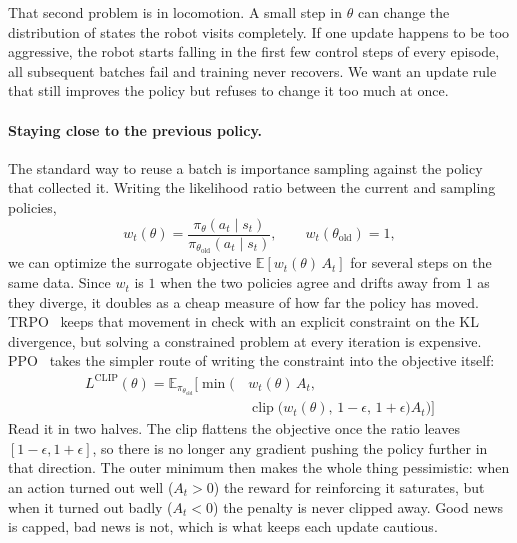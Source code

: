 \documentclass{article}
\theoremstyle{plain}
\theoremstyle{definition}
\theoremstyle{remark}
\begin{document}
That second problem is in locomotion. A small step in $\theta$ can change the 
distribution of states the robot visits completely. If one update happens to be 
too aggressive, the robot starts falling in the first few control steps of every 
episode, all subsequent batches fail and training never recovers. We want an update 
rule that still improves the policy but refuses to change it too much at once.

\paragraph{Staying close to the previous policy.}
The standard way to reuse a batch is importance sampling against the policy that
collected it. Writing the likelihood ratio between the current and sampling
policies,
\begin{equation}
    w_t(\theta) = \frac{\pi_\theta(a_t \mid s_t)}{\pi_{\theta_{\text{old}}}(a_t \mid s_t)},
    \qquad w_t(\theta_{\text{old}}) = 1,
\end{equation}
we can optimize the surrogate objective $\mathbb{E}[w_t(\theta)\,A_t]$ for
several steps on the same data. Since $w_t$ is $1$ when the two policies agree
and drifts away from $1$ as they diverge, it doubles as a cheap measure of how
far the policy has moved. TRPO~\cite{schulman2015trpo} keeps that movement in
check with an explicit constraint on the KL divergence, but solving a constrained
problem at every iteration is expensive.
PPO~\cite{schulman2017ppo} takes the simpler route of writing the constraint
into the objective itself:
\begin{equation}
\begin{split}
    L^{\text{CLIP}}(\theta)
        = \mathbb{E}_{\pi_{\theta_{\text{old}}}} \Big[
          \min\!\big( &\, w_t(\theta)\, A_t, \\
          &\, \operatorname{clip}\!\big( w_t(\theta),\, 1-\epsilon,\, 1+\epsilon \big) A_t \big) \Big]
\end{split}
\end{equation}
Read it in two halves. The clip flattens the objective once the ratio leaves
$[1-\epsilon, 1+\epsilon]$, so there is no longer any gradient pushing the policy
further in that direction. The outer minimum then makes the whole thing
pessimistic: when an action turned out well ($A_t > 0$) the reward for
reinforcing it saturates, but when it turned out badly ($A_t < 0$) the penalty is
never clipped away. Good news is capped, bad news is not, which is what keeps
each update cautious.
\end{document}
